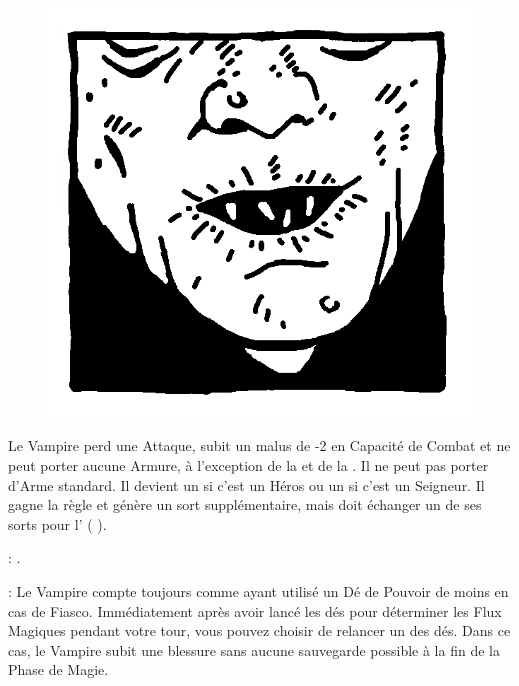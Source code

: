 \begin{figure}
\centering
\includegraphics[width=\logosize]{pics/logo_nosferatu.png}
\end{figure}
Le Vampire perd une Attaque, subit un malus de -2 en Capacité de Combat et ne peut porter aucune Armure, à l'exception de la \mountsprotection{} et de la \innatedefence{}. Il ne peut pas porter d'Arme standard. Il devient un  si c'est un Héros ou un  si c'est un Seigneur. Il gagne la règle \awaken{\skeletons{}, \zombies{}} et génère un sort supplémentaire, mais doit échanger un de ses sorts pour l'\necromancysignature{} (\Pathof{} \necromancy{}).

\vspace{0.5cm}
\bloodties{} : \textbf{\wraiths}.

\vspace{0.5cm}
\ancientbloodpower{} : \textbf{\bloodmagic}\dotfill{}\newline%
Le Vampire compte toujours comme ayant utilisé un Dé de Pouvoir de moins en cas de Fiasco. Immédiatement après avoir lancé les dés pour déterminer les Flux Magiques pendant votre tour, vous pouvez choisir de relancer un des dés. Dans ce cas, le Vampire subit une blessure sans aucune sauvegarde possible à la fin de la Phase de Magie.

\closearmynewsection








